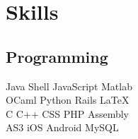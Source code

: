 \documentclass[]{deedy-resume-openfont}
\begin{document}
\begin{minipage}[t]{0.33\textwidth}
    \section{Skills}
        \subsection{Programming}
            Java \textbullet{}
            Shell \textbullet{}
            JavaScript \textbullet{}
            Matlab \\
            OCaml \textbullet{}
            Python \textbullet{}
            Rails \textbullet{}
            \LaTeX\ \\
            C \textbullet{}
            C++ \textbullet{}
            CSS \textbullet{}
            PHP \textbullet{}
            Assembly \\
            AS3 \textbullet{}
            iOS \textbullet{}
            Android \textbullet{}
            MySQL
        \sectionsep

\end{minipage}
\hfill
\end{document}
